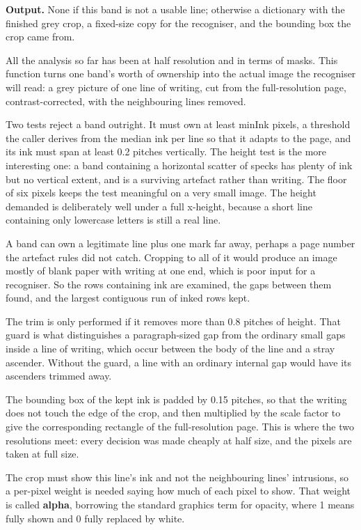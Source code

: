 \noindent\textbf{Output.} None if this band is not a usable line; otherwise a dictionary with the finished grey crop, a fixed-size copy for the recogniser, and the bounding box the crop came from.


All the analysis so far has been at half resolution and in terms of masks. This function turns one band's worth of ownership into the actual image the recogniser will read: a grey picture of one line of writing, cut from the full-resolution page, contrast-corrected, with the neighbouring lines removed.


Two tests reject a band outright. It must own at least minInk pixels, a threshold the caller derives from the median ink per line so that it adapts to the page, and its ink must span at least 0.2 pitches vertically. The height test is the more interesting one: a band containing a horizontal scatter of specks has plenty of ink but no vertical extent, and is a surviving artefact rather than writing. The floor of six pixels keeps the test meaningful on a very small image. The height demanded is deliberately well under a full x-height, because a short line containing only lowercase letters is still a real line.


A band can own a legitimate line plus one mark far away, perhaps a page number the artefact rules did not catch. Cropping to all of it would produce an image mostly of blank paper with writing at one end, which is poor input for a recogniser. So the rows containing ink are examined, the gaps between them found, and the largest contiguous run of inked rows kept.

The trim is only performed if it removes more than 0.8 pitches of height. That guard is what distinguishes a paragraph-sized gap from the ordinary small gaps inside a line of writing, which occur between the body of the line and a stray ascender. Without the guard, a line with an ordinary internal gap would have its ascenders trimmed away.


The bounding box of the kept ink is padded by 0.15 pitches, so that the writing does not touch the edge of the crop, and then multiplied by the scale factor to give the corresponding rectangle of the full-resolution page. This is where the two resolutions meet: every decision was made cheaply at half size, and the pixels are taken at full size.


The crop must show this line's ink and not the neighbouring lines' intrusions, so a per-pixel weight is needed saying how much of each pixel to show. That weight is called \textbf{alpha}, borrowing the standard graphics term for opacity, where 1 means fully shown and 0 fully replaced by white.

